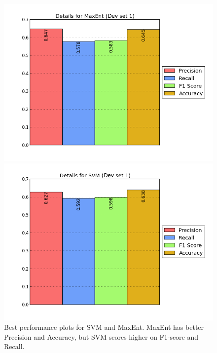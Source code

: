 \begin{figure}[t!]
	\centering
	\begin{minipage}{.45\linewidth}
		\includegraphics[width=\linewidth]{../img/plots/analysis/maxent_stats_best.png}
	\end{minipage}
	\hspace{0.05\linewidth}
	\begin{minipage}{.45\linewidth}
		\includegraphics[width=\linewidth]{../img/plots/analysis/svm_stats_best.png}
	\end{minipage}
	\caption[Best performance plots for SVM and MaxEnt]{Best performance plots for SVM and MaxEnt. MaxEnt has better Precision and Accuracy, but SVM scores higher on F1-score and Recall.}
	\label{fig:best_result}
\end{figure}

